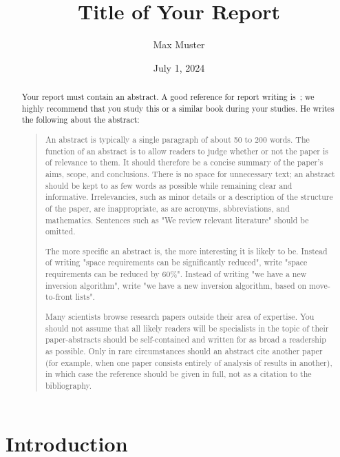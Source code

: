 \documentclass[a4paper,oneside,bibliography=totoc]{scrartcl}
\begin{document}
\subject{Seminar Report} %
\title{Title of Your Report}
\author{Max Muster}
\date{July 1, 2024}
\maketitle

\begin{abstract}

Your report must contain an abstract. A good reference for report writing
is~\citet{zobel2014}; we highly recommend that you study this or a similar book
during your studies. He writes the following about the abstract:

\blockcquote{zobel2004}{%
  An abstract is typically a single paragraph of about 50 to 200 words. The
  function of an abstract is to allow readers to judge whether or not the paper
  is of relevance to them. It should therefore be a concise summary of the
  paper's aims, scope, and conclusions. There is no space for unnecessary text;
  an abstract should be kept to as few words as possible while remaining clear
  and informative. Irrelevancies, such as minor details or a description of the
  structure of the paper, are inappropriate, as are acronyms, abbreviations, and
  mathematics. Sentences such as "We review relevant literature" should be
  omitted.

  The more specific an abstract is, the more interesting it is likely to be.
  Instead of writing "space requirements can be significantly reduced", write
  "space requirements can be reduced by 60\%". Instead of writing "we have a new
  inversion algorithm", write "we have a new inversion algorithm, based on
  move­to-front lists".

  Many scientists browse research papers outside their area of expertise. You
  should not assume that all likely readers will be specialists in the topic of
  their paper-abstracts should be self-contained and written for as broad a
  readership as possible. Only in rare circumstances should an abstract cite
  another paper (for example, when one paper consists entirely of analysis of
  results in another), in which case the reference should be given in full, not
  as a citation to the bibliography.
  }
\end{abstract}

\section{Introduction}
\label{ch:intro}
\end{document}
